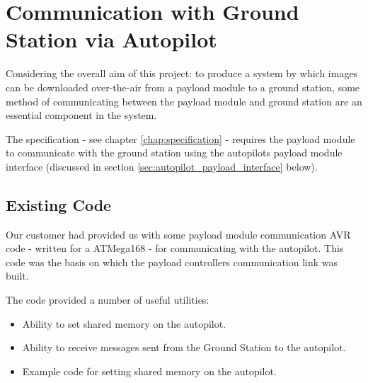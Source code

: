 \section{Communication with Ground Station via Autopilot}
Considering the overall aim of this project: to produce a system by which 
images can be downloaded over-the-air from a payload module to a ground 
station, some method of communicating between the
payload module and ground station are an essential component in the system.

The specification - see chapter \ref{chap:specification} - requires the payload
module to communicate with the ground station using the autopilots payload
module interface (discussed in section \ref{sec:autopilot_payload_interface}
below).


\subsection{Existing Code}
\label{sec:payload_existing_code}
Our customer had provided us with some payload module communication AVR code
- written for a ATMega168 - for communicating with the autopilot. This code
was the basis on which the payload controllers communication link was built.

The code provided a number of useful utilities:
\begin{itemize}
\item Ability to set shared memory on the autopilot.

\item Ability to receive messages sent from the Ground Station to the 
autopilot.

\item Example code for setting shared memory on the autopilot.
\end{itemize}

